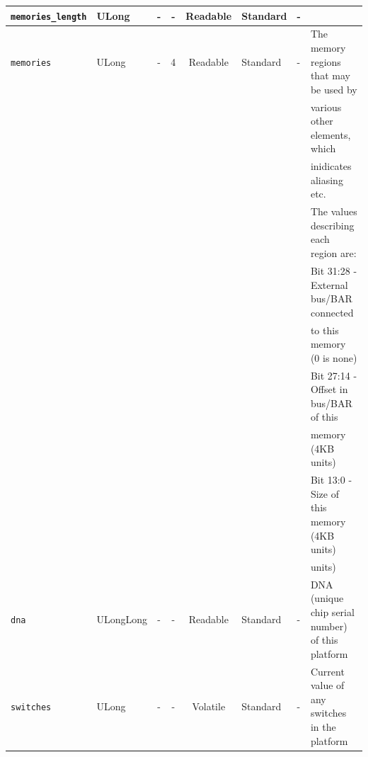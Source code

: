 \documentclass{article}
\begin{document}
\begin{landscape}
\begin{scriptsize}
\begin{tabular}{|p{3cm}|p{1.5cm}|c|c|c|p{1.5cm}|p{1cm}|p{6cm}|}
			\hline
			\verb+memories_length+ & ULong & -           & -               & Readable           & Standard    & -       &                                                                               \\
			\hline
			\verb+memories+    & ULong  & -              & 4               & Readable           & Standard    & -       & The memory regions that may be used by \\
  	                     &        &                &                 &                    &             &         & various other elements, which          \\
  	                     &        &                &                 &                    &             &         & inidicates aliasing etc.               \\
                         &        &                &                 &                    &             &         & The values describing each region are: \\
                         &        &                &                 &                    &             &         & Bit 31:28 - External bus/BAR connected \\
                         &        &                &                 &                    &             &         &             to this memory (0 is none) \\
                         &        &                &                 &                    &             &         & Bit 27:14 - Offset in bus/BAR of this  \\
                         &        &                &                 &                    &             &         &             memory (4KB units)         \\
                         &        &                &                 &                    &             &         & Bit  13:0 - Size of this memory (4KB units) \\
                         &        &                &                 &                    &             &         &             units) \\
			\hline
			\verb+dna+         & ULongLong & -           & -               & Readable           & Standard    & -       & DNA (unique chip serial number) of this platform \\
			\hline
			\verb+switches+    & ULong  & -              & -               & Volatile           & Standard    & -       & Current value of any switches in the platform                                 \\

\end{tabular}
\end{scriptsize}
\end{landscape}
\end{document}
